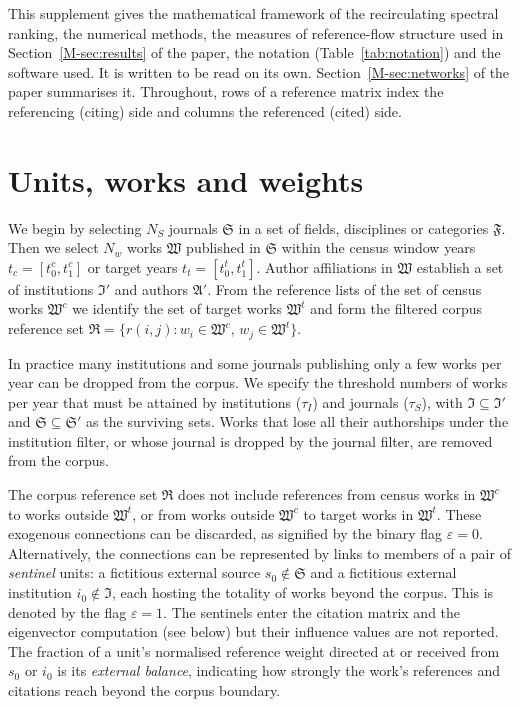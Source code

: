 
This supplement gives the mathematical framework of the recirculating spectral ranking, the numerical methods, the measures of reference-flow structure used in Section~\ref{M-sec:results} of the paper, the notation (Table~\ref{tab:notation}) and the software used. It is written to be read on its own. Section~\ref{M-sec:networks} of the paper summarises it. Throughout, rows of a reference matrix index the referencing (citing) side and columns the referenced (cited) side.

\section{Units, works and weights}
\label{sec:units}

We begin by selecting $N_S$ journals $\mathfrak{S}$ in a set of fields, disciplines or categories $\mathfrak{F}$. Then we select $N_w$ works $\mathfrak{W}$ published in $\mathfrak{S}$ within the census
window years $t_c = [t^c_0, t^c_1]$ or target years $t_t = [t^t_0, t^t_1]$. Author affiliations in $\mathfrak{W}$ establish a set of institutions $\mathfrak{I}'$ and
authors $\mathfrak{A}'$. From the reference lists of the set of census works $\mathfrak{W}^c$ we identify the set of target works $\mathfrak{W}^t$ and form the filtered corpus reference set
$\mathfrak{R}=\{r(i,j):w_i\in\mathfrak{W}^c,\,w_j\in\mathfrak{W}^t\}$.

In practice many institutions and some journals publishing only
a few works per year can be dropped from the corpus. We specify 
the threshold numbers of works per year that must be attained by institutions ($\tau_I$) and journals ($\tau_S$), with $\mathfrak{I}\subseteq\mathfrak{I}'$ and $\mathfrak{S}\subseteq\mathfrak{S}'$ as the surviving sets. Works that lose all their authorships under the institution filter, or whose journal is dropped by the journal filter, are removed from the corpus. 

The corpus reference set $\mathfrak{R}$ does not include references from census works in $\mathfrak{W}^c$ to works outside $\mathfrak{W}^t$, or from works outside $\mathfrak{W}^c$ to target works in $\mathfrak{W}^t$. These exogenous connections can be discarded, as signified by the binary flag $\varepsilon=0$. Alternatively, the connections can be represented by links to members of a pair of \emph{sentinel} units: a fictitious external source $s_0\notin\mathfrak{S}$ and a fictitious external institution $i_0\notin\mathfrak{I}$, each hosting the totality of works beyond the corpus. This is denoted by the flag $\varepsilon = 1$. The sentinels enter the citation matrix and the eigenvector computation (see below) but their influence values are not reported. The fraction of a unit's normalised reference weight directed at or received from $s_0$ or $i_0$ is its \emph{external balance}, indicating how strongly the work's references and citations reach beyond the corpus boundary.

